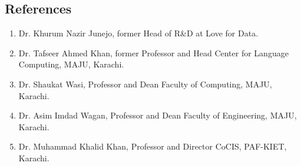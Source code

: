 \documentclass[a4paper, 10pt]{article}
\begin{document}
\subsection*{\textcolor{NavyBlue}{References}}
\begin{enumerate}
\itemsep-4pt
\item Dr. Khurum Nazir Junejo, former Head of R\&D at Love for Data.
\item Dr. Tafseer Ahmed Khan, former Professor and Head Center for Language Computing, MAJU, Karachi.
\item Dr. Shaukat Wasi, Professor and Dean Faculty of Computing, MAJU, Karachi.
\item Dr. Asim Imdad Wagan, Professor and Dean Faculty of Engineering, MAJU, Karachi.
\item Dr. Muhammad Khalid Khan, Professor and Director CoCIS, PAF-KIET, Karachi.
\end{enumerate}
\end{document}
